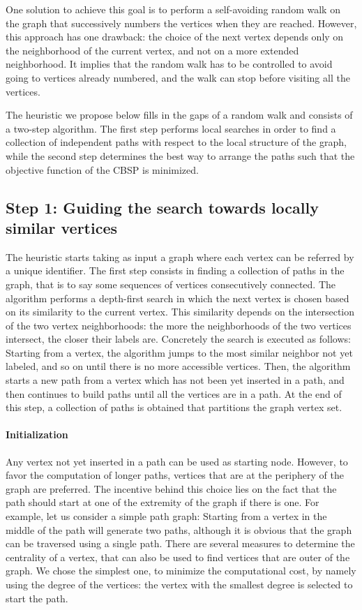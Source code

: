 \documentclass{scrartcl}
\theoremstyle{plain}
\newcommand{\cbsp}{CBSP}
\begin{document}
One solution to achieve this goal is to perform a self-avoiding random walk on 
the graph that successively numbers the vertices when they are reached. 
However, this approach has one drawback: the choice of the next vertex 
depends only on the neighborhood of the current vertex, and not on a more 
extended neighborhood. It implies that the random walk has to be controlled to 
avoid going to vertices already numbered, and the walk can stop before visiting 
all the vertices.

The heuristic we propose below fills in the gaps of a random walk and consists 
of a two-step algorithm. The first step performs local searches in order to find 
a collection of independent paths with respect to the local structure of the 
graph, while the second step determines the best way to arrange the paths such 
that the objective function of the \cbsp{} is minimized.

\subsection{Step 1: Guiding the search towards locally similar vertices}
\label{subsec:step1}

The heuristic starts taking as input a graph where each vertex can be referred 
by a unique identifier. The first step consists in finding a collection of paths 
in the graph, that is to say some sequences of vertices consecutively connected. 
The algorithm performs a depth-first search in which the next vertex is chosen 
based on its similarity to the current vertex. This similarity depends on the 
intersection of the two vertex neighborhoods: the more the neighborhoods of the 
two vertices intersect, the closer their labels are. Concretely the search is 
executed as follows: Starting from a vertex, the algorithm jumps to the most 
similar neighbor not yet labeled, and so on until there is no more accessible 
vertices. Then, the algorithm starts a new path from a vertex which has not been 
yet inserted in a path, and then continues to build paths until all the vertices 
are in a path. At the end of this step, a collection of paths is obtained that 
partitions the graph vertex set.

\paragraph{Initialization}

Any vertex not yet inserted in a path can be used as starting node. However, to 
favor the computation of longer paths, vertices that are at the periphery of the 
graph are preferred. The incentive behind this choice lies on the fact that the 
path should start at one of the extremity of the graph if there is one. For 
example, let us consider a simple path graph: Starting from a vertex in the 
middle of the path will generate two paths, although it is obvious that the 
graph can be traversed using a single path. There are several measures to 
determine the centrality of a vertex, that can also be used to find vertices 
that are outer of the graph. We chose the simplest one, to minimize the 
computational cost, by namely using the degree of the vertices: the vertex with 
the smallest degree is selected to start the path.
\end{document}
